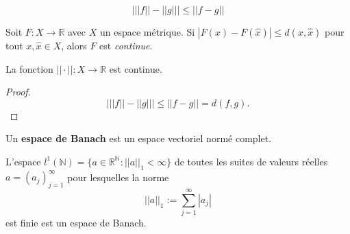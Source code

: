 \begin{theo}
    \begin{equation*}
        \bigg| ||f||-||g|| \bigg| \leq ||f-g||
    \end{equation*}
\end{theo}

\begin{remark}
    Soit $F:X\rightarrow\mathbb{R}$ avec $X$ un espace métrique. Si $|F(x)-F(\hat x)|\leq d(x,\hat x)$ pour tout $x,\hat x\in X$, alors $F$ est \textit{continue}.
\end{remark}

\begin{theo}
    La fonction $||\cdot||:X\rightarrow\mathbb{R}$ est continue.
\end{theo}

\begin{proof}
    \begin{equation*}
        \bigg| ||f||-||g|| \bigg| \leq ||f-g|| = d(f,g).
    \end{equation*}
\end{proof}



\begin{definition}
    Un \textbf{espace de Banach} est un espace vectoriel normé complet.
\end{definition}

\begin{example}
    L'espace $l^1(\mathbb{N}) = \{a \in \mathbb{R}^\mathbb{N}:||a||_1<\infty\}$ de toutes les suites de valeurs réelles $a=(a_j)_{j=1}^\infty$ pour lesquelles la norme
    \begin{equation*}
        ||a||_1 := \sum_{j=1}^\infty|a_j|
    \end{equation*}
    est finie est un espace de Banach.
\end{example}


